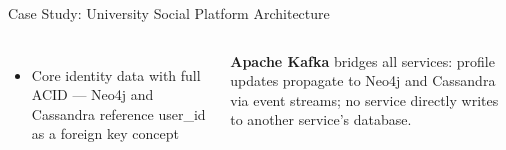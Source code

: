 \documentclass[aspectratio=169]{beamer}
\begin{document}
\begin{frame}{Case Study: University Social Platform Architecture}
\begin{columns}[T]
      \begin{itemize}\scriptsize
        \item Core identity data with full ACID — Neo4j and Cassandra reference user\_id as a foreign key concept
      \end{itemize}
      \vspace{0.2cm}
      \begin{tcolorbox}[infobox, title=Integration Fabric]
        \scriptsize
        \textbf{Apache Kafka} bridges all services: profile updates propagate to Neo4j and Cassandra via event streams; no service directly writes to another service's database.
      \end{tcolorbox}
  \end{columns}
\end{frame}

\end{document}
